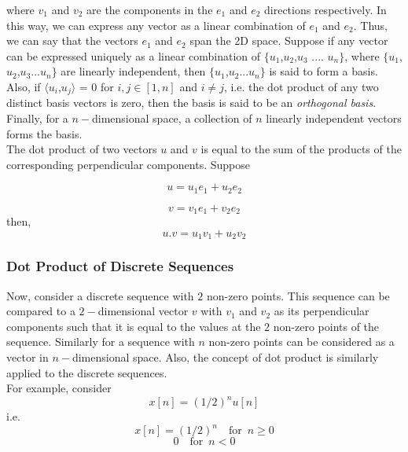     where $v_1$ and $v_2$ are the components in the $e_1$ and $e_2$ directions respectively. In this way, we can express any vector as a linear combination of $e_1$ and $e_2$. Thus, we can say that the vectors $e_1$ and $e_2$ span the 2D space.
    Suppose if any vector can be expressed uniquely as a linear combination of $\{ u_1$,$u_2$,$u_3$ .... $u_n \}$, where $\{ u_1$,$u_2$,$u_3$...$u_n \}$ are linearly independent, then $\{ u_1$,$u_2$...$u_n \}$ is said to form a basis.\\
\noindent
Also, if $\langle u_i$,$u_j \rangle$ = 0 for $i,j \in [1,n]$ and $i \neq j$, i.e. the dot product of any two distinct basis vectors is zero,  then the basis is said to be an \emph{orthogonal basis}. Finally, for a $n-$dimensional space, a collection of $n$ linearly independent vectors forms the basis.\\
\noindent
The dot product of two vectors $u$ and $v$ is equal to the sum of the products of the corresponding perpendicular components. Suppose

				\begin{equation*}u = u_1e_1 + u_2e_2\end{equation*}
                        
                        \begin{equation*}v = v_1e_1 + v_2e_2\end{equation*} 
\noindent                        
                        then,\begin{equation*} u.v = u_1v_1 + u_2v_2\end{equation*}
           
\subsubsection{Dot Product of Discrete Sequences}           
Now, consider a discrete sequence with $2$ non-zero points. This sequence can be compared to a $2-$dimensional vector $v$ with $v_1$ and $v_2$ as its perpendicular components such that it is equal to the values at the $2$ non-zero points of the sequence. Similarly for a sequence with $n$ non-zero points can be considered as a vector in $n-$dimensional space. Also, the concept of dot product is similarly applied to the discrete sequences.\\
For example, consider
\begin{equation*}
  x[n] = (1/2)^n u[n]
\end{equation*}
    i.e.
     \begin{equation*}
    x[n] = (1/2)^n	\enspace	\enspace \text{for} \enspace	 n\geq0\end{equation*}
    \begin{equation*}	 0	\enspace  \enspace	 \text{for} \enspace	 n<0\end{equation*}
               
